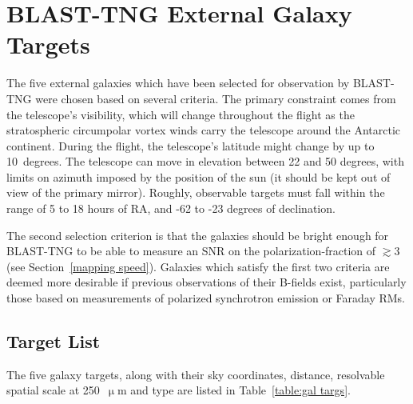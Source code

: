 \section{BLAST-TNG External Galaxy Targets}\label{target selection}

The five external galaxies which have been selected for observation by BLAST-TNG were chosen based on several criteria. The primary constraint comes from the telescope's visibility, which will change throughout the flight as the stratospheric circumpolar vortex winds carry the telescope around the Antarctic continent. During the flight, the telescope's latitude might change by up to 10~degrees. The telescope can move in elevation between 22 and 50 degrees, with limits on azimuth imposed by the position of the sun (it should be kept out of view of the primary mirror). Roughly, observable targets must fall within the range of 5 to 18 hours of RA, and -62 to -23 degrees of declination.

The second selection criterion is that the galaxies should be bright enough for BLAST-TNG to be able to measure an SNR on the polarization-fraction of $\gtrsim$3 (see Section~\ref{mapping speed}). Galaxies which satisfy the first two criteria are deemed more desirable if previous observations of their B-fields exist, particularly those based on measurements of polarized synchrotron emission or Faraday RMs.

\subsection{Target List}\label{targ list}

The five galaxy targets, along with their sky coordinates, distance, resolvable spatial scale at 250~$\upmu$m and type are listed in Table~\ref{table:gal targs}.

